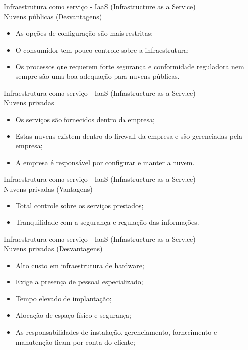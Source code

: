 \documentclass{beamer}
\begin{document}
\begin{frame}[fragile]{Infraestrutura como serviço - IaaS (Infrastructure as a Service) \\ Nuvens públicas (Desvantagens)}\justifying
      \begin{itemize}
            \item As opções de configuração são mais restritas;
            \item O consumidor tem pouco controle sobre a infraestrutura;
            \item Os processos que requerem forte segurança e conformidade reguladora nem sempre são uma boa adequação para nuvens públicas.
      \end{itemize}
\end{frame}
\begin{frame}[fragile]{Infraestrutura como serviço - IaaS (Infrastructure as a Service) \\ Nuvens privadas}\justifying
      \begin{itemize}
            \item Os serviços são fornecidos dentro da empresa;
            \item Estas nuvens existem dentro do firewall da empresa e são gerenciadas pela empresa;
            \item A empresa é responsável por configurar e manter a nuvem.
      \end{itemize}
\end{frame}
\begin{frame}[fragile]{Infraestrutura como serviço - IaaS (Infrastructure as a Service) \\ Nuvens privadas (Vantagens)}\justifying
      \begin{itemize}
            \item Total controle sobre os serviços prestados;
            \item Tranquilidade com a segurança e regulação das informações.
      \end{itemize}
\end{frame}
\begin{frame}[fragile]{Infraestrutura como serviço - IaaS (Infrastructure as a Service) \\ Nuvens privadas (Desvantagens)}\justifying
      \begin{itemize}
            \item Alto custo em infraestrutura de hardware;
            \item Exige a presença de pessoal especializado;
            \item Tempo elevado de implantação;
            \item Alocação de espaço físico e segurança;
            \item As responsabilidades de instalação, gerenciamento, fornecimento e manutenção ficam por conta do cliente;
      \end{itemize}
\end{frame}
\end{document}
